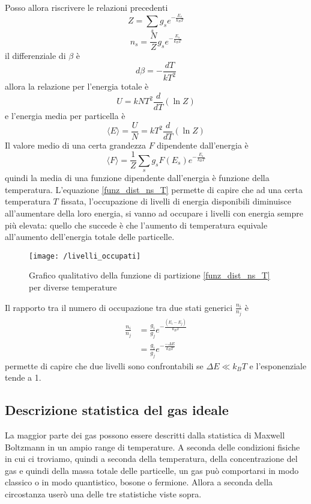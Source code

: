 Posso allora riscrivere le relazioni precedenti 
\begin{equation}
Z = \sum_s g_s e^{ - \frac{E_s}{k_B T} }
\end{equation}
\begin{equation}
n_s = \frac{N}{Z} g_s e^{ - \frac{E_s}{k_B T} }
\label{funz_dist_ns_T}
\end{equation}
il differenziale di $\beta$ è
\begin{equation}
d \beta = - \frac{d T}{k T^2}
\end{equation}
allora la relazione per l'energia totale è
\begin{equation}
U = k N T^2 \frac{d}{dT} (\ln Z)
\end{equation}
e l'energia media per particella è
\begin{equation}
\langle E \rangle = \frac{U}{N} = k T^2 \frac{d}{dT} (\ln Z)
\end{equation}
Il valore medio di una certa grandezza $F$ dipendente dall'energia è
\begin{equation}
\langle F \rangle = \frac{1}{Z} \sum_s g_s F(E_s) e^{ -\frac{E_s}{k_B T} }
\end{equation}
quindi la media di una funzione dipendente dall'energia è funzione della temperatura.
L'equazione \ref{funz_dist_ns_T} permette di capire che ad una certa temperatura $T$ fissata, l'occupazione di livelli di energia disponibili diminuisce all'aumentare della loro energia, si vanno ad occupare i livelli con energia sempre più elevata: 
quello che succede è che l'aumento di temperatura equivale all'aumento dell'energia totale delle particelle.
\begin{figure}[h]
\centering
\texttt{[image: /livelli\_occupati]}
\caption{Grafico qualitativo della funzione di partizione \ref{funz_dist_ns_T} per diverse temperature }
\end{figure}

Il rapporto tra il numero di occupazione tra due stati generici $\frac{n_i}{n_j}$ è 
\begin{equation}
\begin{split}
\frac{n_i}{n_j} & = \frac{g_i}{g_j} e^{ - \frac{(E_i - E_j)}{k_B T} } \\
& = \frac{g_i}{g_j} e^{ - \frac{- \Delta E}{k_B T} }
\end{split}
\end{equation}
permette di capire che due livelli sono confrontabili se $\Delta E \ll k_B T$ e l'esponenziale tende a 1.


\subsection{Descrizione statistica del gas ideale}
La maggior parte dei gas possono essere descritti dalla statistica di Maxwell Boltzmann in un ampio range di temperature.
A seconda delle condizioni fisiche in cui ci troviamo, quindi a seconda della temperatura, della concentrazione del gas e quindi della massa totale delle particelle, un gas può comportarsi in modo classico o in modo quantistico, bosone o fermione. 
Allora a seconda della circostanza userò una delle tre statistiche viste sopra.

